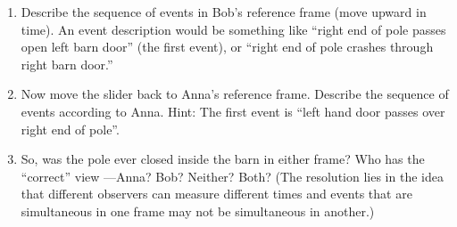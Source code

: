 \begin{enumerate}
\item Describe the sequence of events in Bob's reference frame (move upward in time).  An event description would be something like ``right end of pole passes open left barn door'' (the first event), or ``right end of pole crashes through right barn door.''
\answerspace{1.1in}


\item Now move the slider back to Anna's reference frame. Describe the sequence of events according to Anna.  Hint: The first event is ``left hand door passes over right end of pole''.
\answerspace{1.1in}


\item So, was the pole ever closed inside the barn in either frame? Who has the ``correct'' view —Anna? Bob? Neither? Both?  (The resolution lies in the idea that different observers can measure different times and events that are simultaneous in one frame may not be simultaneous in another.)
\answerspace{1.1in}

\end{enumerate}
